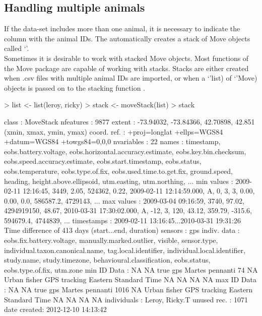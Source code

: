\documentclass[article,nojss]{jss}
\newcommand{\fct}[1]{{\code{#1()}}}
\newcommand{\class}[1]{{`\code{#1}'}}
\begin{document}
\subsection{Handling multiple animals}
If the data-set includes more than one animal, it is necessary to indicate the column with the animal IDs. The \fct{move} automatically creates a stack of Move objects called \class{MoveStack}. \\
Sometimes it is desirable to work with stacked Move objects. Most functions of the Move package are capable of working with stacks. Stacks are either created when .csv files with multiple animal IDs are imported, or when a \class(list) of \class(Move) objects is passed on to the stacking function \fct{moveStack}.

\begin{Schunk}
\begin{Sinput}
> list <- list(leroy, ricky)
> stack <- moveStack(list)
> stack
\end{Sinput}
\begin{Soutput}
class       : MoveStack 
nfeatures   : 9877 
extent      : -73.94032, -73.84366, 42.70898, 42.851  (xmin, xmax, ymin, ymax)
coord. ref. : +proj=longlat +ellps=WGS84 +datum=WGS84 +towgs84=0,0,0 
nvariables  : 22
names       :           timestamp, eobs.battery.voltage, eobs.horizontal.accuracy.estimate, eobs.key.bin.checksum, eobs.speed.accuracy.estimate,    eobs.start.timestamp, eobs.status, eobs.temperature, eobs.type.of.fix, eobs.used.time.to.get.fix, ground.speed, heading, height.above.ellipsoid, utm.easting, utm.northing, ... 
min values  : 2009-02-11 12:16:45,                 3449,                              2.05,                524362,                         0.22, 2009-02-11 12:14:59.000,           A,                0,                3,                         3,         0.00,    0.00,                    0.0,    586587.2,      4729143, ... 
max values  : 2009-03-04 09:16:59,                 3740,                             97.02,            4294919150,                        48.67, 2010-03-31 17:30:02.000,           A,              -12,                3,                       120,        43.12,  359.79,                 -315.6,    594679.4,      4744839, ... 
timestamps  : 2009-02-11 13:16:45...2010-03-31 19:31:26 Time difference of 413 days  (start...end, duration) 
sensors     : gps 
indiv. data : eobs.fix.battery.voltage, manually.marked.outlier, visible, sensor.type, individual.taxon.canonical.name, tag.local.identifier, individual.local.identifier, study.name, study.timezone, behavioural.classification, eobs.status, eobs.type.of.fix, utm.zone 
min ID Data : NA NA true gps Martes pennanti   74 NA Urban fisher GPS tracking Eastern Standard Time NA NA NA NA 
max ID Data : NA NA true gps Martes pennanti 1016 NA Urban fisher GPS tracking Eastern Standard Time NA NA NA NA 
individuals : Leroy, Ricky.T 
unused rec. : 1071 
date created: 2012-12-10 14:13:42 
\end{Soutput}
\end{Schunk}
\end{document}
